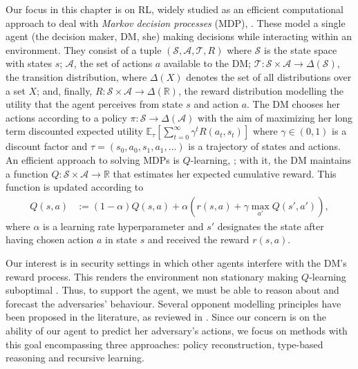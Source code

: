 Our focus in this chapter is on RL, widely studied as an efficient computational approach to deal with \textit{Markov decision processes} (MDP), \parencite{howard:dp}. These model a single agent (the decision maker, DM, she)
making decisions 
while interacting within an environment.  
They consist of a
tuple $\left( \mathcal{S}, \mathcal{A}, \mathcal{T}, R\right)$
where $\mathcal{S}$ is the state space with states $s$; $\mathcal{A}$,   the set of
actions $a$ available to the DM;
$\mathcal{T}: \mathcal{S} \times \mathcal{A} \rightarrow \Delta (\mathcal{S})$, the transition distribution, where $\Delta(X)$ denotes the set of
all distributions over a set $X$;
and, finally, $R : \mathcal{S} \times \mathcal{A}  \rightarrow \Delta(\mathbb{R}) $, the reward distribution modelling the utility that the agent perceives
from state $s$ and action $a$. 
The DM chooses her actions according to a policy $\pi: \mathcal{S} \rightarrow \Delta(\mathcal{A})$ 
with the aim of maximizing 
her long term discounted expected utility
$ 
 \mathbb{E}_{\tau} \left[  \sum_{t=0}^\infty \gamma^t R(a_t, s_t) \right] 
 $ 
where $\gamma \in (0,1)$ is a discount factor and $\tau = (s_0, a_0, s_1, a_1, \ldots)$ is a trajectory of states and actions.
  An efficient approach to solving MDPs is $Q$-learning, \parencite{sutton2012reinforcement}; with it, the DM maintains a
 function
$Q : \mathcal{S} \times \mathcal{A} \rightarrow \mathbb{R}$ that estimates
her expected cumulative reward. This function is updated according to
\begin{align}\label{eq:ql}
Q(s,a) &:= (1 - \alpha) Q(s, a)  +  \alpha \left(r(s,a) + \gamma\max_{a'} Q(s', a') \right),
\end{align}
where $\alpha$ is a learning rate hyperparameter
and $s'$ designates the state %
after having chosen action $a$ in state $s$ and received the reward $r(s,a)$.

Our interest is in security settings in which other  agents
interfere with the DM's reward process. This renders the environment
non stationary making  $Q$-learning suboptimal \parencite{marl_over}. 
Thus, to support the agent,
we must be able to reason about and forecast the adversaries' behaviour.
Several opponent modelling principles have been proposed in the  literature,
as reviewed in \cite{Albrecht2018AutonomousAM}. 
Since our concern is on the ability of our agent to predict 
her adversary's actions, we focus on methods
with this goal encompassing three approaches: policy reconstruction, type-based reasoning and recursive learning.

